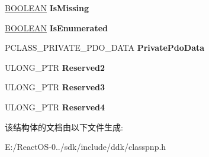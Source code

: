 \begin{DoxyCompactItemize}
\begin{tabbing}
\end{tabbing}\item 
\mbox{\label{struct___p_h_y_s_i_c_a_l___d_e_v_i_c_e___e_x_t_e_n_s_i_o_n_a7f3af6c9003a01d91640511a0a1eee97}} 
\hyperlink{_processor_bind_8h_a112e3146cb38b6ee95e64d85842e380a}{B\+O\+O\+L\+E\+AN} {\bfseries Is\+Missing}
\item 
\mbox{\label{struct___p_h_y_s_i_c_a_l___d_e_v_i_c_e___e_x_t_e_n_s_i_o_n_a335b1ef640ec0081fb303244c29b21cb}} 
\hyperlink{_processor_bind_8h_a112e3146cb38b6ee95e64d85842e380a}{B\+O\+O\+L\+E\+AN} {\bfseries Is\+Enumerated}
\item 
\mbox{\label{struct___p_h_y_s_i_c_a_l___d_e_v_i_c_e___e_x_t_e_n_s_i_o_n_aefecd39020cb87af0a2793a98a997a11}} 
P\+C\+L\+A\+S\+S\+\_\+\+P\+R\+I\+V\+A\+T\+E\+\_\+\+P\+D\+O\+\_\+\+D\+A\+TA {\bfseries Private\+Pdo\+Data}
\item 
\mbox{\label{struct___p_h_y_s_i_c_a_l___d_e_v_i_c_e___e_x_t_e_n_s_i_o_n_ac83e72dbe8ab412d3090fecb30979cda}} 
U\+L\+O\+N\+G\+\_\+\+P\+TR {\bfseries Reserved2}
\item 
\mbox{\label{struct___p_h_y_s_i_c_a_l___d_e_v_i_c_e___e_x_t_e_n_s_i_o_n_a714c05502fe30a3fa171d36cbae04c38}} 
U\+L\+O\+N\+G\+\_\+\+P\+TR {\bfseries Reserved3}
\item 
\mbox{\label{struct___p_h_y_s_i_c_a_l___d_e_v_i_c_e___e_x_t_e_n_s_i_o_n_a2555f2948580c0a474d103ea897363f3}} 
U\+L\+O\+N\+G\+\_\+\+P\+TR {\bfseries Reserved4}
\end{DoxyCompactItemize}


该结构体的文档由以下文件生成\+:\begin{DoxyCompactItemize}
\item 
E\+:/\+React\+O\+S-\/0../sdk/include/ddk/classpnp.\+h\end{DoxyCompactItemize}
